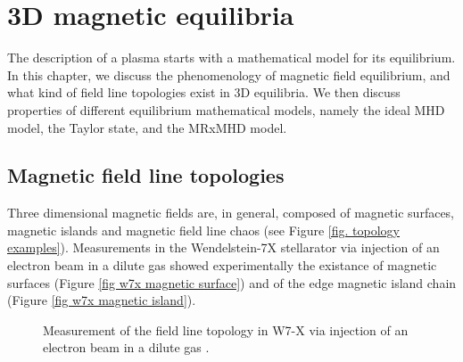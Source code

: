 \documentclass[my_thesis.tex]{subfiles}
\begin{document}
\chapter{3D magnetic equilibria}

The description of a plasma starts with a mathematical model for its equilibrium. In this chapter, we discuss the phenomenology of magnetic field equilibrium, and what kind of field line topologies exist in 3D equilibria. We then discuss properties of different equilibrium mathematical models, namely the ideal MHD model, the Taylor state, and the MRxMHD model.

\section{Magnetic field line topologies}
Three dimensional magnetic fields are, in general, composed of  magnetic surfaces, magnetic islands and magnetic field line chaos (see Figure \ref{fig. topology examples}). Measurements in the Wendelstein-7X stellarator via injection of an electron beam in a dilute gas \citep{pedersenConfirmationTopologyWendelstein2016} showed experimentally the existance of magnetic surfaces (Figure \ref{fig w7x magnetic surface}) and of the edge magnetic island chain (Figure \ref{fig w7x magnetic island}).

\begin{figure}%
	\centering
	\qquad
	\caption{Measurement of the field line topology in W7-X via injection of an electron beam in a dilute gas \citep{pedersenConfirmationTopologyWendelstein2016}.}
	\label{fig. w7x topology measurement}%
\end{figure}
\end{document}
